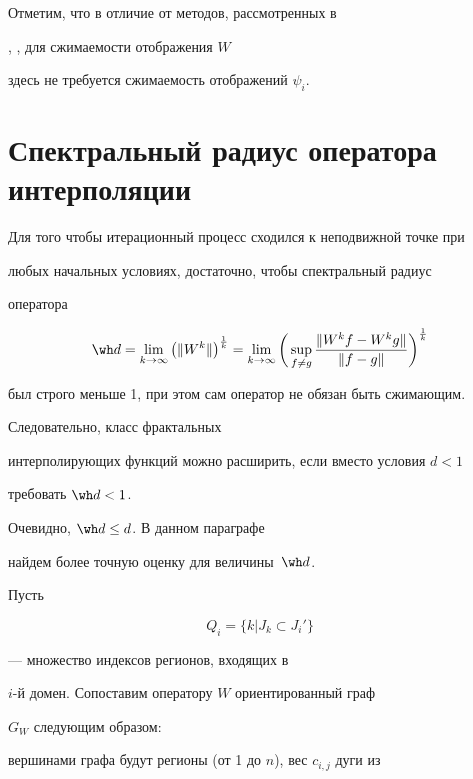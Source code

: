 Отметим, что в отличие от методов, рассмотренных в 


\cite{barnsley1}, \cite{recbar}, для сжимаемости отображения $W$


здесь не требуется сжимаемость отображений $\psi_i$.





\section{Спектральный радиус оператора интерполяции} \label{szim}





Для того чтобы итерационный процесс сходился к неподвижной точке при


любых начальных условиях, достаточно, чтобы спектральный радиус


оператора


\begin{equation} \label{hatd}


\wh d = \lim_{k \to \infty} \left(\|W^k\|\right)^{\frac{1}{k}} =


\lim_{k \to \infty} \bigg(\sup_{f \ne g}


\frac{\|W^k f- W^kg \|}{\|f-g\|}\bigg)^{\frac{1}{k}}


\end{equation}


был строго меньше 1, при этом сам оператор не обязан быть сжимающим.


Следовательно, класс фрактальных


интерполирующих функций можно расширить, если вместо условия $d<1$


требовать $\wh d < 1 $.


Очевидно, $\wh d \le d$. В данном параграфе 


найдем более точную оценку для величины~$\wh d$.





Пусть


$$


Q_i = \{k | J_k \subset J_i' \}


$$


--- множество индексов регионов, входящих в


$i$-й домен. Сопоставим оператору $ W $ ориентированный граф


$G_W$ следующим образом:


вершинами графа будут регионы (от 1 до $n$), вес $c_{i,j}$ дуги из


